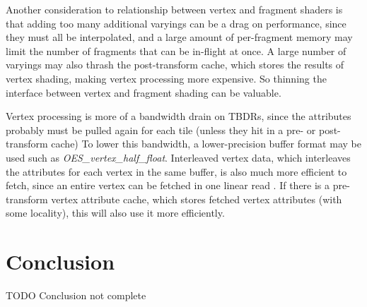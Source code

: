 Another consideration to relationship between vertex and fragment shaders is
that adding too many additional varyings can be a drag on performance, since
they must all be interpolated, and a large amount of per-fragment memory may
limit the number of fragments that can be in-flight at once.  A large number of
varyings may also thrash the post-transform cache, which stores the results of
vertex shading, making vertex processing more expensive.  So thinning the
interface between vertex and fragment shading can be valuable.

Vertex processing is more of a bandwidth drain on TBDRs, since the attributes
probably must be pulled again for each tile (unless they hit in a pre- or post-
transform cache)  To lower this bandwidth, a lower-precision buffer format may
be used such as \textit{OES\_vertex\_half\_float}.  Interleaved vertex data,
which interleaves the attributes for each vertex in the same buffer, is also
much more efficient to fetch, since an entire vertex can be fetched in one
linear read \cite{apple_vertex}.  If there is a pre-transform vertex attribute
cache, which stores fetched vertex attributes (with some locality), this will
also use it more efficiently.  

\section{Conclusion}\label{Jon-McCaffrey-Conclusion}

TODO Conclusion not complete

 











